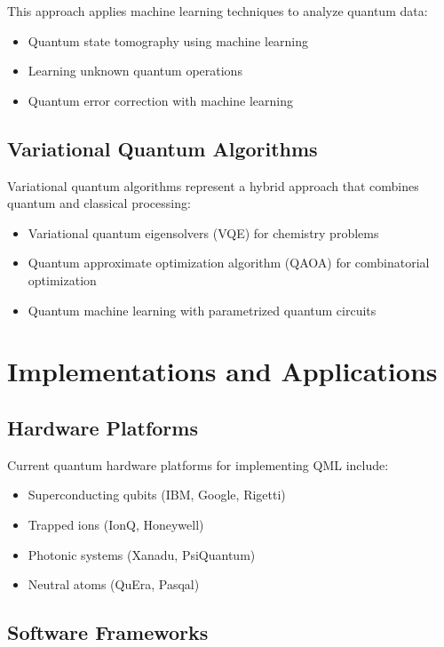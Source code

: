 \documentclass[12pt,a4paper]{article}
\begin{document}
This approach applies machine learning techniques to analyze quantum data:

\begin{itemize}
    \item Quantum state tomography using machine learning
    \item Learning unknown quantum operations
    \item Quantum error correction with machine learning
\end{itemize}

\subsection{Variational Quantum Algorithms}

Variational quantum algorithms represent a hybrid approach that combines quantum and classical processing:

\begin{itemize}
    \item Variational quantum eigensolvers (VQE) for chemistry problems
    \item Quantum approximate optimization algorithm (QAOA) for combinatorial optimization
    \item Quantum machine learning with parametrized quantum circuits
\end{itemize}

\section{Implementations and Applications}

\subsection{Hardware Platforms}

Current quantum hardware platforms for implementing QML include:

\begin{itemize}
    \item Superconducting qubits (IBM, Google, Rigetti)
    \item Trapped ions (IonQ, Honeywell)
    \item Photonic systems (Xanadu, PsiQuantum)
    \item Neutral atoms (QuEra, Pasqal)
\end{itemize}

\subsection{Software Frameworks}
\end{document}
